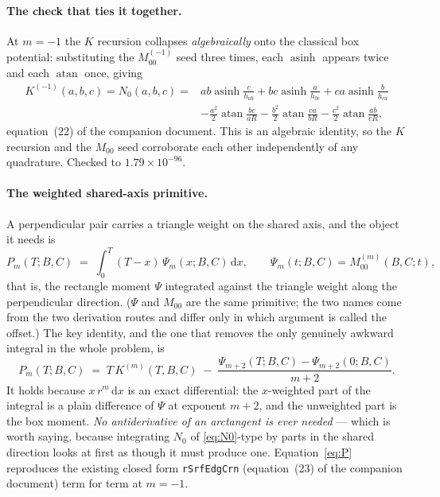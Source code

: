 \documentclass[11pt]{article}
\theoremstyle{remark}
\newcommand{\dd}{\mathrm{d}}
\newcommand{\asinh}{\operatorname{asinh}}
\newcommand{\atan}{\operatorname{atan}}
\newcommand{\code}[1]{\texttt{#1}}
\begin{document}
\paragraph{The check that ties it together.} At $m = -1$ the $K$ recursion collapses
\emph{algebraically} onto the classical box potential: substituting the $M_{00}^{(-1)}$
seed three times, each $\asinh$ appears twice and each $\atan$ once, giving
\begin{equation}
\begin{aligned}
K^{(-1)}(a,b,c) = N_0(a,b,c) = {}&
ab\asinh\frac{c}{h_{ab}} + bc\asinh\frac{a}{h_{bc}} + ca\asinh\frac{b}{h_{ca}}\\
&-\frac{a^2}{2}\atan\frac{bc}{aR} - \frac{b^2}{2}\atan\frac{ca}{bR} - \frac{c^2}{2}\atan\frac{ab}{cR},
\end{aligned}
\label{eq:N0}
\end{equation}
equation~(22) of the companion document. This is an algebraic identity, so the
$K$ recursion and the $M_{00}$ seed corroborate each other independently of any quadrature.
Checked to $1.79\times10^{-96}$.

\paragraph{The weighted shared-axis primitive.} A perpendicular pair carries a triangle
weight on the shared axis, and the object it needs is
\begin{equation}
P_m(T;B,C) \;=\; \int_0^T (T-x)\,\Psi_m(x;B,C)\,\dd x,
\qquad \Psi_m(t;B,C) = M_{00}^{(m)}(B,C;t),
\end{equation}
that is, the rectangle moment $\Psi$ integrated against the triangle weight along the
perpendicular direction. ($\Psi$ and $M_{00}$ are the same primitive; the two names come
from the two derivation routes and differ only in which argument is called the offset.)
The key identity, and the one that removes the only genuinely awkward integral in the
whole problem, is
\begin{equation}
\boxed{\;
P_m(T;B,C) \;=\; T\,K^{(m)}(T,B,C) \;-\; \frac{\Psi_{m+2}(T;B,C) - \Psi_{m+2}(0;B,C)}{m+2}. \;}
\label{eq:P}
\end{equation}
It holds because $x\,r^m\,\dd x$ is an exact differential: the $x$-weighted part of the
integral is a plain difference of $\Psi$ at exponent $m+2$, and the unweighted part is the
box moment. \emph{No antiderivative of an arctangent is ever needed} --- which is worth
saying, because integrating $N_0$ of \eqref{eq:N0}-type by parts in the shared direction
looks at first as though it must produce one. Equation~\eqref{eq:P} reproduces the
existing closed form \code{rSrfEdgCrn} (equation~(23) of the companion document) term for
term at $m = -1$.
\end{document}
